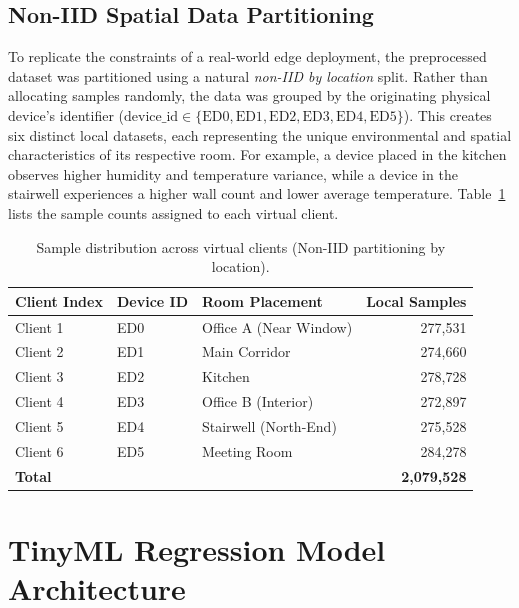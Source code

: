 \subsection{Non-IID Spatial Data Partitioning}
To replicate the constraints of a real-world edge deployment, the preprocessed dataset was partitioned using a natural \textit{non-IID by location} split. Rather than allocating samples randomly, the data was grouped by the originating physical device's identifier ($\text{device\_id} \in \{\text{ED0}, \text{ED1}, \text{ED2}, \text{ED3}, \text{ED4}, \text{ED5}\}$). This creates six distinct local datasets, each representing the unique environmental and spatial characteristics of its respective room. For example, a device placed in the kitchen observes higher humidity and temperature variance, while a device in the stairwell experiences a higher wall count and lower average temperature. Table~\ref{tab:client-data} lists the sample counts assigned to each virtual client.

\begin{table}[H]
  \centering
  \begin{tabular}{lllr}
    \toprule
    \textbf{Client Index} & \textbf{Device ID} & \textbf{Room Placement} & \textbf{Local Samples} \\
    \midrule
    Client 1 & ED0 & Office A (Near Window) & 277,531 \\
    Client 2 & ED1 & Main Corridor           & 274,660 \\
    Client 3 & ED2 & Kitchen                 & 278,728 \\
    Client 4 & ED3 & Office B (Interior)     & 272,897 \\
    Client 5 & ED4 & Stairwell (North-End)   & 275,528 \\
    Client 6 & ED5 & Meeting Room            & 284,278 \\
    \midrule
    \textbf{Total} & & & \textbf{2,079,528} \\
    \bottomrule
  \end{tabular}
  \caption{Sample distribution across virtual clients (Non-IID partitioning by location).}
  \label{tab:client-data}
\end{table}

\section{TinyML Regression Model Architecture}
\label{sec:tinyml-arch}

